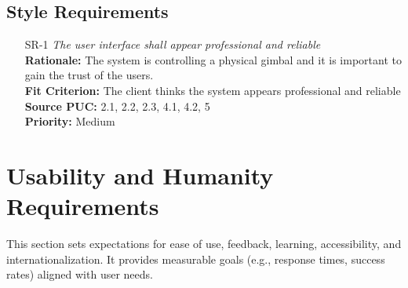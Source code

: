 \documentclass[12pt]{article}
\begin{document}
\subsection{Style Requirements}
\begin{itemize}[leftmargin=*]
  \item[SR-1] \emph{The user interface shall appear professional and reliable}\\[2mm]
        \textbf{Rationale:} The system is controlling a physical gimbal and it is important to gain the trust of the users.\\
        \textbf{Fit Criterion:} The client thinks the system appears professional and reliable\\
        \textbf{Source PUC:} 2.1, 2.2, 2.3, 4.1, 4.2, 5 \\
        \textbf{Priority:} Medium
\end{itemize}

\section{Usability and Humanity Requirements}
This section sets expectations for ease of use, feedback, learning, accessibility, and internationalization.
It provides measurable goals (e.g., response times, success rates) aligned with user needs.
\end{document}
